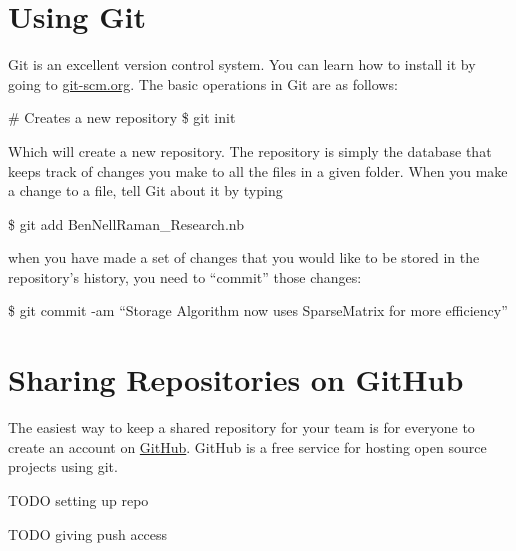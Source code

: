 \section{Using Git}

Git is an excellent version control system. You can learn how to install it by going to \href{http://git-scm.org}{git-scm.org}. The basic operations in Git are as follows:

\begin{code}
	   \# Creates a new repository
	   \$ git init
\end{code}
Which will create a new repository. The repository is simply the database that keeps track of changes you make to all the files in a given folder. When you make a change to a file, tell Git about it by typing
\begin{code}
	   \$ git add BenNellRaman\_Research.nb
\end{code}
when you have made a set of changes that you would like to be stored in the repository's history, you need to ``commit'' those changes:
\begin{code}
	   \$ git commit -am ``Storage Algorithm now uses SparseMatrix for more efficiency''
\end{code}

\section{Sharing Repositories on GitHub} 

The easiest way to keep a shared repository for your team is for everyone to create an account on \href{http://www.github.com}{GitHub}. GitHub is a free service for hosting open source projects using git. 

TODO setting up repo

TODO giving push access
